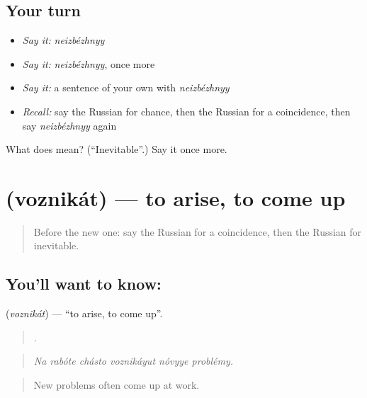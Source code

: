 \subsection*{Your turn}
\begin{itemize}
\raggedright
  \item \emph{Say it:} \emph{neizbézhnyy}
  \item \emph{Say it:} \emph{neizbézhnyy}, once more
  \item \emph{Say it:} a sentence of your own with \emph{neizbézhnyy}
  \item \emph{Recall:} say the Russian for chance, then the Russian for a coincidence, then say \emph{neizbézhnyy} again
\end{itemize}

\begin{tcolorbox}[breakable,colback=teal!4,colframe=teal!35!black,title={Before you move on}]
What does  mean? (\textquotedblleft{}Inevitable\textquotedblright{}.) Say it once more.
\end{tcolorbox}
\section[\texorpdfstring{\ru{возникать} (voznikát)}{возникать (voznikát)}]{ (voznikát) — to arise, to come up}

\label{lesson:RU-C355-voznikat}



\begin{quote}
Before the new one: say the Russian for a coincidence, then the Russian for inevitable.
\end{quote}

\subsection*{You'll want to know: }
\textbf{} (\emph{voznikát}) — \textquotedblleft{}to arise, to come up\textquotedblright{}.

\begin{quote}
     .
\end{quote}

\begin{quote}
\emph{Na rabóte chásto voznikáyut nóvyye problémy.}
\end{quote}

\begin{quote}
New problems often come up at work.
\end{quote}

